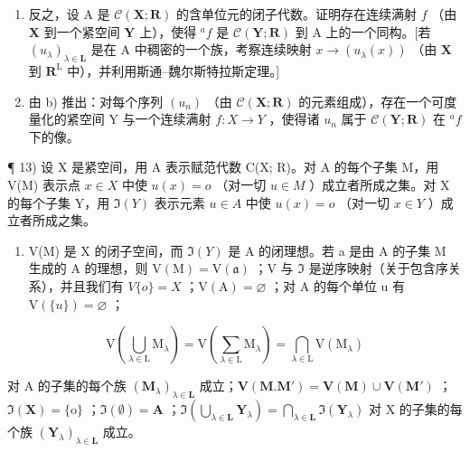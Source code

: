 \begin{enumerate}
\def\labelenumi{\alph{enumi})}
\setcounter{enumi}{1}
\item
  反之，设 A 是 \(\mathcal{C}(\mathbf{X};\mathbf{R})\) 的含单位元的闭子代数。证明存在连续满射 \(f\) （由 \(\mathbf{X}\) 到一个紧空间 \(\mathbf{Y}\) 上），使得 \(^a f\) 是 \(\mathcal{C}(\mathbf{Y};\mathbf{R})\) 到 A 上的一个同构。{[}若 \((u_{\lambda})_{\lambda \in \mathbf{L}}\) 是在 A 中稠密的一个族，考察连续映射 \(x\to (u_{\lambda}(x))\) （由 \(\mathbf{X}\) 到 \(\mathbf{R}^{\mathrm{L}}\) 中），并利用斯通–魏尔斯特拉斯定理。{]}
\item
  由 b) 推出：对每个序列 \((u_{n})\) （由 \(\mathcal{C}(\mathbf{X};\mathbf{R})\) 的元素组成），存在一个可度量化的紧空间 Y 与一个连续满射 \(f: X \to Y\) ，使得诸 \(u_{n}\) 属于 \(\mathcal{C}(\mathbf{Y};\mathbf{R})\) 在 \(^{a}f\) 下的像。
\end{enumerate}

¶ 13) 设 X 是紧空间，用 A 表示赋范代数 C(X; R)。对 A 的每个子集 M，用 V(M) 表示点 \(x \in X\) 中使 \(u(x) = o\) （对一切 \(u \in M\) ）成立者所成之集。对 X 的每个子集 Y，用 \(\Im(Y)\) 表示元素 \(u \in A\) 中使 \(u(x) = o\) （对一切 \(x \in Y\) ）成立者所成之集。

\begin{enumerate}
\def\labelenumi{\alph{enumi})}
\tightlist
\item
  V(M) 是 X 的闭子空间，而 \(\Im(Y)\) 是 A 的闭理想。若 a 是由 A 的子集 M 生成的 A 的理想，则 \(\mathrm{V}(\mathrm{M})=\mathrm{V}(\mathfrak{a})\) ；V 与 \(\Im\) 是逆序映射（关于包含序关系），并且我们有 \(V\{o\}=X\) ；\(\mathrm{V}(\mathrm{A})=\varnothing\) ；对 A 的每个单位 u 有 \(\mathrm{V}(\{u\})=\varnothing\) ；
\end{enumerate}

\[
\mathrm{V} \left(\bigcup_ {\lambda \in \mathrm{L}} \mathrm{M} _ {\lambda}\right) = \mathrm{V} \left(\sum_ {\lambda \in \mathrm{L}} \mathrm{M} _ {\lambda}\right) = \bigcap_ {\lambda \in \mathrm{L}} \mathrm{V} (\mathrm{M} _ {\lambda})
\]

对 A 的子集的每个族 \((\mathbf{M}_{\lambda})_{\lambda \in \mathbf{L}}\) 成立；\(\mathbf{V}(\mathbf{M}. \mathbf{M}') = \mathbf{V}(\mathbf{M}) \cup \mathbf{V}(\mathbf{M}')\) ；\(\Im(\mathbf{X}) = \{\mathrm{o}\}\) ；\(\Im(\emptyset) = \mathbf{A}\) ；\(\Im\left(\bigcup_{\lambda \in \mathbf{L}} \mathbf{Y}_{\lambda}\right) = \bigcap_{\lambda \in \mathbf{L}} \Im(\mathbf{Y}_{\lambda})\) 对 X 的子集的每个族 \((\mathbf{Y}_{\lambda})_{\lambda \in \mathbf{L}}\) 成立。

